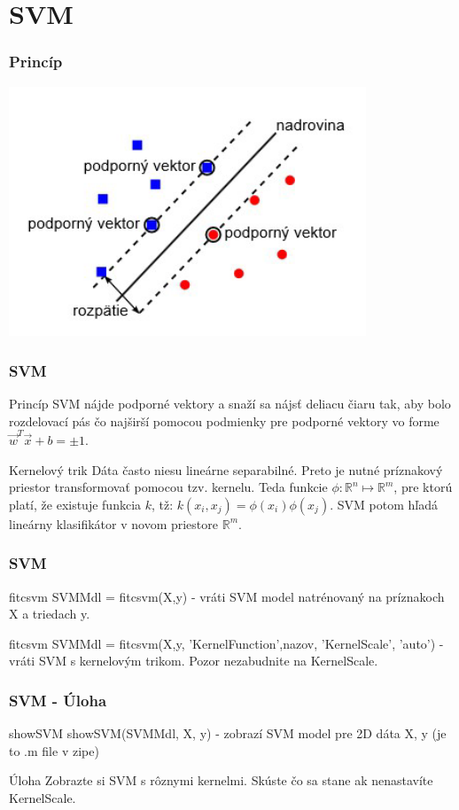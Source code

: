 \documentclass{beamer}
\begin{document}
\section{SVM}

\begin{frame}
\frametitle{Princíp}
\center
\includegraphics[width=0.8\textwidth]{svm.png}
\end{frame}

\begin{frame}
\frametitle{SVM}
\begin{block}{Princíp}
SVM nájde podporné vektory a snaží sa nájsť deliacu čiaru tak, aby bolo rozdelovací pás čo najširší pomocou podmienky pre podporné vektory vo forme $\vec{w}^T \vec{x} + b = \pm 1$.
\end{block}

\begin{block}{Kernelový trik}
Dáta často niesu lineárne separabilné. Preto je nutné príznakový priestor transformovať pomocou tzv. kernelu. Teda funkcie $\phi : \mathbb{R}^n \mapsto \mathbb{R}^{m}$, pre ktorú platí, že existuje funkcia $k$, tž: $k(x_i, x_j) = \phi(x_i) \phi(x_j).$ SVM potom hľadá lineárny klasifikátor v novom priestore $\mathbb{R}^m$. 
\end{block}
\end{frame}


\begin{frame}
\frametitle{SVM}
\begin{block}{fitcsvm}
SVMMdl = fitcsvm(X,y) - vráti SVM model natrénovaný na príznakoch X a triedach y.
\end{block}

\begin{block}{fitcsvm}
SVMMdl = fitcsvm(X,y, 'KernelFunction',nazov, 'KernelScale', 'auto') - vráti SVM s kernelovým trikom. Pozor nezabudnite na KernelScale.
\end{block}
\end{frame}


\begin{frame}
\frametitle{SVM - Úloha}
\begin{block}{showSVM}
showSVM(SVMMdl, X, y) - zobrazí SVM model pre 2D dáta X, y (je to .m file v zipe)
\end{block}

\begin{block}{Úloha}
Zobrazte si SVM s rôznymi kernelmi. Skúste čo sa stane ak nenastavíte KernelScale.
\end{block}
\end{frame}
\end{document}
